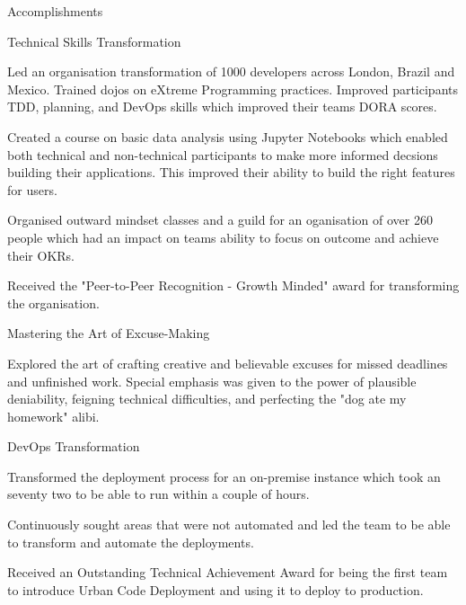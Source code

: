 \documentclass[]{kyvernitis-resume}
\begin{document}
\resumeheader
{}
{}
{}
{}
{}
{}
{\address{Surbiton, London, United Kingdom}}

\begin{section}{Accomplishments}
 \begin{subsectionaccomplishment}{Technical Skills Transformation}
	 \item {Led an organisation transformation of 1000 developers across London, Brazil and Mexico. Trained dojos on eXtreme Programming practices.
	             Improved participants TDD, planning, and DevOps skills which improved their teams DORA scores.}
	 \item {Created a course on basic data analysis using Jupyter Notebooks which enabled both
	             technical and non-technical participants to make more informed decsions building their applications.
	             This improved their ability to build the right features for users.}
	 \item {Organised outward mindset classes and a guild for an oganisation of over 260 people
	             which had an impact on teams ability to focus on outcome and achieve their OKRs.}
	 \item Received the "Peer-to-Peer Recognition - Growth Minded" award for transforming the organisation.
 \end{subsectionaccomplishment}

 \begin{subsectionaccomplishment}{Mastering the Art of Excuse-Making}
	 \item{Explored the art of crafting creative and believable excuses for missed deadlines and unfinished work. Special emphasis was given to the power of plausible deniability, feigning technical difficulties, and perfecting the "dog ate my homework" alibi.}
 \end{subsectionaccomplishment}

 \begin{subsectionaccomplishment}{DevOps Transformation}
	 \item Transformed the deployment process for an on-premise instance which took an seventy two to be able to run within a couple of hours.
	 \item Continuously sought areas that were not automated and led the team to be able to transform and automate the deployments.
	 \item Received an Outstanding Technical Achievement Award for being the first team to introduce Urban Code Deployment and using it to deploy to production.
 \end{subsectionaccomplishment}

\end{section}
\end{document}
